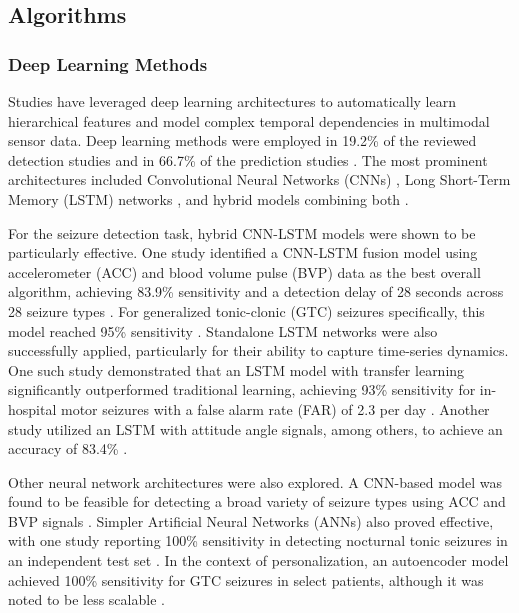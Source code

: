 \subsection{Algorithms}

\subsubsection{Deep Learning Methods}
Studies have leveraged deep learning architectures to automatically learn hierarchical features and model complex temporal dependencies in multimodal sensor data. Deep learning methods were employed in 19.2\% of the reviewed detection studies \cite{Yu2023-ss, Nasseri2021-xn, Larsen2024-vn, Wang2025-ql, Tang2021-td} and in 66.7\% of the prediction studies \cite{Vieluf2023-ta, Meisel2020-ii}. The most prominent architectures included Convolutional Neural Networks (CNNs) \cite{Yu2023-ss, Tang2021-td}, Long Short-Term Memory (LSTM) networks \cite{Meisel2020-ii, Yu2023-ss, Wang2025-ql}, and hybrid models combining both \cite{Yu2023-ss}.

For the seizure detection task, hybrid CNN-LSTM models were shown to be particularly effective. One study identified a CNN-LSTM fusion model using accelerometer (ACC) and blood volume pulse (BVP) data as the best overall algorithm, achieving 83.9\% sensitivity and a detection delay of 28 seconds across 28 seizure types \cite{Yu2023-ss}. For generalized tonic-clonic (GTC) seizures specifically, this model reached 95\% sensitivity \cite{Yu2023-ss}. Standalone LSTM networks were also successfully applied, particularly for their ability to capture time-series dynamics. One such study demonstrated that an LSTM model with transfer learning significantly outperformed traditional learning, achieving 93\% sensitivity for in-hospital motor seizures with a false alarm rate (FAR) of 2.3 per day \cite{Nasseri2021-xn}. Another study utilized an LSTM with attitude angle signals, among others, to achieve an accuracy of 83.4\% \cite{Wang2025-ql}.

Other neural network architectures were also explored. A CNN-based model was found to be feasible for detecting a broad variety of seizure types using ACC and BVP signals \cite{Tang2021-td}. Simpler Artificial Neural Networks (ANNs) also proved effective, with one study reporting 100\% sensitivity in detecting nocturnal tonic seizures in an independent test set \cite{Larsen2024-vn}. In the context of personalization, an autoencoder model achieved 100\% sensitivity for GTC seizures in select patients, although it was noted to be less scalable \cite{Yu2023-ss}.

